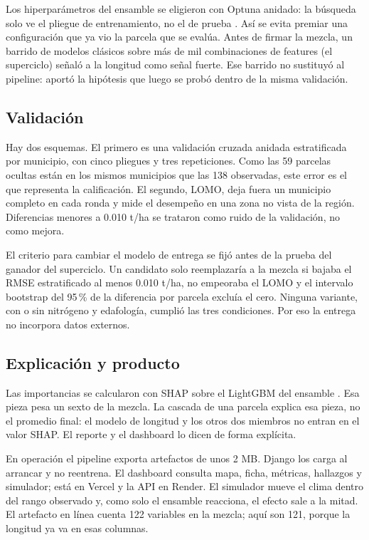 Los hiperparámetros del ensamble se eligieron con Optuna anidado: la búsqueda solo ve el pliegue de entrenamiento, no el de prueba \citep{akiba2019}. Así se evita premiar una configuración que ya vio la parcela que se evalúa. Antes de firmar la mezcla, un barrido de modelos clásicos sobre más de mil combinaciones de features (el superciclo) señaló a la longitud como señal fuerte. Ese barrido no sustituyó al pipeline: aportó la hipótesis que luego se probó dentro de la misma validación.

\subsection{Validación}

Hay dos esquemas. El primero es una validación cruzada anidada estratificada por municipio, con cinco pliegues y tres repeticiones. Como las 59 parcelas ocultas están en los mismos municipios que las 138 observadas, este error es el que representa la calificación. El segundo, LOMO, deja fuera un municipio completo en cada ronda y mide el desempeño en una zona no vista de la región. Diferencias menores a 0.010 t/ha se trataron como ruido de la validación, no como mejora.

El criterio para cambiar el modelo de entrega se fijó antes de la prueba del ganador del superciclo. Un candidato solo reemplazaría a la mezcla si bajaba el RMSE estratificado al menos 0.010 t/ha, no empeoraba el LOMO y el intervalo bootstrap del 95\,\% de la diferencia por parcela excluía el cero. Ninguna variante, con o sin nitrógeno y edafología, cumplió las tres condiciones. Por eso la entrega no incorpora datos externos.

\subsection{Explicación y producto}

Las importancias se calcularon con SHAP sobre el LightGBM del ensamble \citep{lundberg2017}. Esa pieza pesa un sexto de la mezcla. La cascada de una parcela explica esa pieza, no el promedio final: el modelo de longitud y los otros dos miembros no entran en el valor SHAP. El reporte y el dashboard lo dicen de forma explícita.

En operación el pipeline exporta artefactos de unos 2 MB. Django los carga al arrancar y no reentrena. El dashboard consulta mapa, ficha, métricas, hallazgos y simulador; está en Vercel y la API en Render. El simulador mueve el clima dentro del rango observado y, como solo el ensamble reacciona, el efecto sale a la mitad. El artefacto en línea cuenta 122 variables en la mezcla; aquí son 121, porque la longitud ya va en esas columnas.
